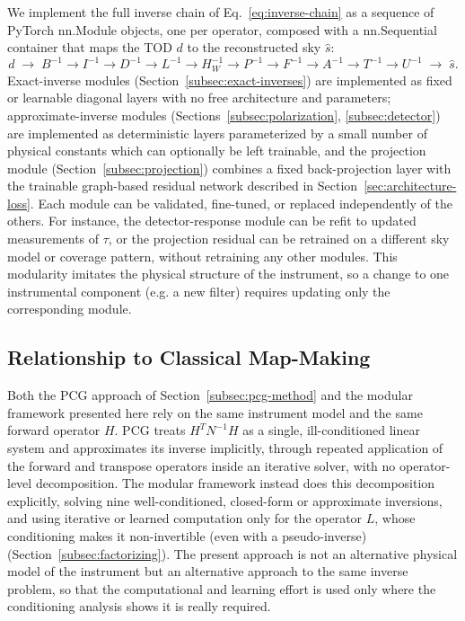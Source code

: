 \documentclass[a4paper,11pt]{article}
\begin{document}
We implement the full inverse chain of Eq.~\ref{eq:inverse-chain} as a sequence of PyTorch nn.Module objects, one per operator, composed with a nn.Sequential container that maps the TOD $d$ to the reconstructed sky $\hat{s}$:
\begin{equation}
    d \;\longrightarrow\;
    B^{-1} \to I^{-1} \to D^{-1} \to L^{-1} \to H_W^{-1} \to P^{-1} \to F^{-1} \to A^{-1} \to T^{-1} \to U^{-1}
    \;\longrightarrow\; \hat{s}.
    \label{eq:inverse-separated}
\end{equation}
Exact-inverse modules (Section~\ref{subsec:exact-inverses}) are
implemented as fixed or learnable diagonal layers with no free
architecture and parameters; approximate-inverse modules
(Sections~\ref{subsec:polarization}, \ref{subsec:detector}) are
implemented as deterministic layers parameterized by a small number of
physical constants which can optionally be left trainable, and the projection
module (Section~\ref{subsec:projection}) combines a fixed back-projection layer with the trainable graph-based residual network described in Section~\ref{sec:architecture-loss}. Each module can be validated, fine-tuned, or replaced independently of the others. For
instance, the detector-response module can be refit to updated measurements of $\tau$, or the projection residual can be retrained on a different sky model or coverage pattern, without retraining any other modules. This modularity imitates the physical structure of the instrument, so a change to one instrumental component (e.g. a new filter) requires updating only the corresponding module.

\subsection{Relationship to Classical Map-Making}
\label{subsec:relationship-pcg}

Both the PCG approach of Section~\ref{subsec:pcg-method} and the
modular framework presented here rely on the same instrument model and the same forward operator $H$. PCG treats $H^TN^{-1}H$ as a single, ill-conditioned linear system and approximates its inverse implicitly, through repeated application of the forward and transpose operators inside an iterative solver, with no operator-level decomposition.
The modular framework instead does this decomposition explicitly,
solving nine well-conditioned, closed-form or approximate inversions, and using iterative or learned computation only for the operator $L$, whose conditioning makes it non-invertible (even with a pseudo-inverse) (Section~\ref{subsec:factorizing}). The present approach
is not an alternative physical model of the instrument but an alternative  approach to the same inverse problem, so that the computational and learning effort is used only where the
conditioning analysis shows it is really required.
\end{document}
